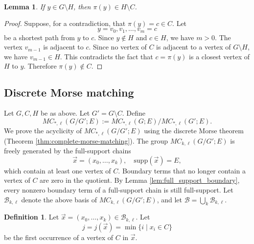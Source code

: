 \documentclass{amsart}
\numberwithin{equation}{section}
\theoremstyle{plain}
\newtheorem{lem}[thm]{Lemma}
\theoremstyle{remark}
\theoremstyle{definition}
\newtheorem{defn}[thm]{Definition}
\numberwithin{equation}{section}
\newcommand{\B}{\mathcal{B}}
\newcommand{\supp}{\mathrm{supp}}
\begin{document}
\begin{lem}\label{lem:gate-avoids-corner}
If $y\in G\setminus H$, then $\pi(y)\in H\setminus C$.
\end{lem}

\begin{proof}
Suppose, for a contradiction, that $\pi(y)=c\in C$.  Let
\[
  y=v_0,v_1,\ldots,v_m=c
\]
be a shortest path from $y$ to $c$.
Since $y\notin H$ and $c\in H$, we have $m>0$.  The vertex $v_{m-1}$ is adjacent to $c$.
Since no vertex of $C$ is adjacent to a vertex of $G\setminus H$, we have $v_{m-1}\in H$.
This contradicts the fact that $c=\pi(y)$ is a closest vertex of $H$ to $y$.  Therefore $\pi(y)\notin C$.
\end{proof}

\subsection{Discrete Morse matching}
Let $G,C,H$ be as above.
Let $G'=G\setminus C$. Define
\[
MC_{*,\ell}(G/G';E):=MC_{*,\ell}(G;E)/MC_{*,\ell}(G';E).
\]
We prove the acyclicity of $MC_{*,\ell}(G/G';E)$ using the discrete Morse theorem (Theorem \ref{thm:complete-morse-matching}).
The group $MC_{k,\ell}(G/G';E)$ is freely generated by the full-support chains
\[
  \vec{x}=(x_0,\ldots,x_k),\quad \supp(\vec{x})=E,
\]
which contain at least one vertex of $C$.
Boundary terms that no longer contain a vertex of $C$ are zero in the quotient.  By Lemma \ref{lem:full_support_boundary}, every nonzero boundary term of a full-support chain is still full-support.
Let $\B_{k,\ell}$ denote the above basis of $MC_{k,\ell}(G/G';E)$, and let $\B=\bigcup_k\B_{k,\ell}$.

\begin{defn}
    Let $\vec{x}=(x_0,\ldots,x_k)\in\B_{k,\ell}$.
    Let
    \[
    j=j(\vec{x})=\min\{i\mid x_i\in C\}
    \]
    be the first occurrence of a vertex of $C$ in $\vec{x}$.
\end{defn}
\end{document}
